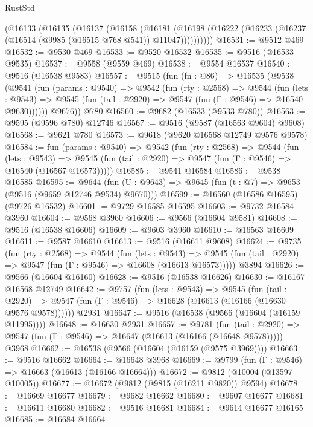 \begin{lexlean}{RustStd}
\begin{coremodule}
    (@16133
      (@16135
        (@16137
          (@16158
            (@16181
              (@16198 (@16222 (@16233 (@16237 (@16514 (@9985 (@16515 @768 @541)) @11047))))))))))
@16531 := @9512 @469
@16532 := @9530 @469
@16533 := @9520 @16532
@16535 := @9516 (@16533 @9535)
@16537 := @9558 (@9559 @469)
@16538 := @9554 @16537
@16540 := @9516 (@16538 @9583)
@16557 := @9515
    (fun (fn : @86) =>
    @16535
      (@9538
        (@9541
          (fun (params : @9540) =>
          @9542
            (fun (rty : @2568) =>
            @9544
              (fun (lets : @9543) =>
              @9545 (fun (tail : @2920) => @9547 (fun (Γ : @9546) => @16540 @9630))))))
        @9676))
    @780
@16560 := @9682 (@16533 (@9533 @780))
@16563 := @9595 (@9596 @780) @12746
@16567 := @9516 (@9587 (@16563 @9604) @9608)
@16568 := @9621 @780
@16573 := @9618 (@9620 @16568 @12749 @9576 @9578)
@16584 := fun (params : @9540) =>
  @9542
    (fun (rty : @2568) =>
    @9544
      (fun (lets : @9543) =>
      @9545 (fun (tail : @2920) => @9547 (fun (Γ : @9546) => @16540 (@16567 @16573)))))
@16585 := @9541 @16584
@16586 := @9538 @16585
@16595 := @9644
    (fun (U : @9643) => @9645 (fun (t : @7) => @9653 (@9516 (@9659 @12746 @9534) @9670)))
@16599 := @16560 (@16586 @16595) (@9726 @16532)
@16601 := @9729 @16585 @16595
@16603 := @9732 @16584 @3960
@16604 := @9568 @3960
@16606 := @9566 (@16604 @9581)
@16608 := @9516 (@16538 @16606)
@16609 := @9603 @3960
@16610 := @16563 @16609
@16611 := @9587 @16610
@16613 := @9516 (@16611 @9608)
@16624 := @9735
    (fun (rty : @2568) =>
    @9544
      (fun (lets : @9543) =>
      @9545 (fun (tail : @2920) => @9547 (fun (Γ : @9546) => @16608 (@16613 @16573)))))
    @3894
@16626 := @9566 (@16604 @16160)
@16628 := @9516 (@16538 @16626)
@16630 := @16167 @16568 @12749
@16642 := @9757
    (fun (lets : @9543) =>
    @9545
      (fun (tail : @2920) =>
      @9547 (fun (Γ : @9546) => @16628 (@16613 (@16166 (@16630 @9576 @9578))))))
    @2931
@16647 := @9516 (@16538 (@9566 (@16604 (@16159 @11995))))
@16648 := @16630 @2931
@16657 := @9781
    (fun (tail : @2920) => @9547 (fun (Γ : @9546) => @16647 (@16613 (@16166 (@16648 @9578)))))
    @3968
@16662 := @16538 (@9566 (@16604 (@16159 (@9575 @3969))))
@16663 := @9516 @16662
@16664 := @16648 @3968
@16669 := @9799 (fun (Γ : @9546) => @16663 (@16613 (@16166 @16664)))
@16672 := @9812 (@10004 (@13597 @10005))
@16677 := @16672 (@9812 (@9815 (@16211 @9820)) @9594)
@16678 := @16669 @16677
@16679 := @9682 @16662
@16680 := @9607 @16677
@16681 := @16611 @16680
@16682 := @9516 @16681
@16684 := @9614 @16677 @16165
@16685 := @16684 @16664

\end{coremodule}
\end{lexlean}

